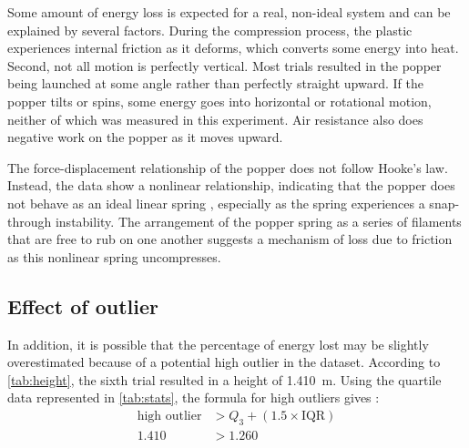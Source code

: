 \documentclass[reprint,amsmath,amssymb,aps,twoside]{revtex4-2} %
\begin{document}

Some amount of energy loss is expected for a real, non-ideal system and can be explained by several factors. During the compression process, the plastic experiences internal friction as it deforms, which converts some energy into heat. Second, not all motion is perfectly vertical. Most trials resulted in the popper being launched at some angle rather than perfectly straight upward. If the popper tilts or spins, some energy goes into horizontal or rotational motion, neither of which was measured in this experiment. Air resistance also does negative work on the popper as it moves upward.

The force-displacement relationship of the popper does not follow Hooke’s law. Instead, the data show a nonlinear relationship, indicating that the popper does not behave as an ideal linear spring \cite{rohland_hookslaw,tipler,barrons,openstax}, especially as the spring experiences a snap-through instability. The arrangement of the popper spring as a series of filaments that are free to rub on one another suggests a mechanism of loss due to friction as this nonlinear spring uncompresses. 

\subsection{Effect of outlier}
In addition, it is possible that the percentage of energy lost may be slightly overestimated because of a potential high outlier in the dataset. According to \cref{tab:height}, the sixth trial resulted in a height of \qty{1.410}{\meter}. Using the quartile data represented in \cref{tab:stats}, the formula for high outliers gives \cite{starnes:2015:practice}:
\begin{align}
\text{high outlier} &> Q_3 + (1.5 \times \text{IQR}) \\
1.410 &> 1.260
\end{align}
\end{document}

